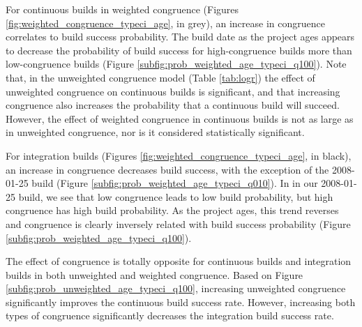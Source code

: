 \documentclass[12pt,oneside]{book}
\begin{document}



For continuous builds in weighted congruence (Figures \ref{fig:weighted_congruence_typeci_age}, in grey), an increase in congruence correlates to build success probability. The build date as the project ages appears to decrease the probability of build success for high-congruence builds more than low-congruence builds (Figure \ref{subfig:prob_weighted_age_typeci_q100}). Note that, in the unweighted congruence model (Table \ref{tab:logr}) the effect of unweighted congruence on continuous builds is significant, and that increasing congruence also increases the probability that a continuous build will succeed. However, the effect of weighted congruence in continuous builds is not as large as in unweighted congruence, nor is it considered statistically significant.

For integration builds (Figures \ref{fig:weighted_congruence_typeci_age}, in black), an increase in congruence decreases build success, with the exception of the 2008-01-25 build (Figure \ref{subfig:prob_weighted_age_typeci_q010}). In in our 2008-01-25 build, we see that low congruence leads to low build probability, but high congruence has high build probability. As the project ages, this trend reverses and congruence is clearly inversely related with build success probability (Figure \ref{subfig:prob_weighted_age_typeci_q100}).

The effect of congruence is totally opposite for continuous builds and integration builds in both unweighted and weighted congruence. Based on Figure \ref{subfig:prob_unweighted_age_typeci_q100}, increasing unweighted congruence significantly improves the continuous build success rate. However, increasing both types of congruence significantly decreases the integration build success rate.

\end{document}

